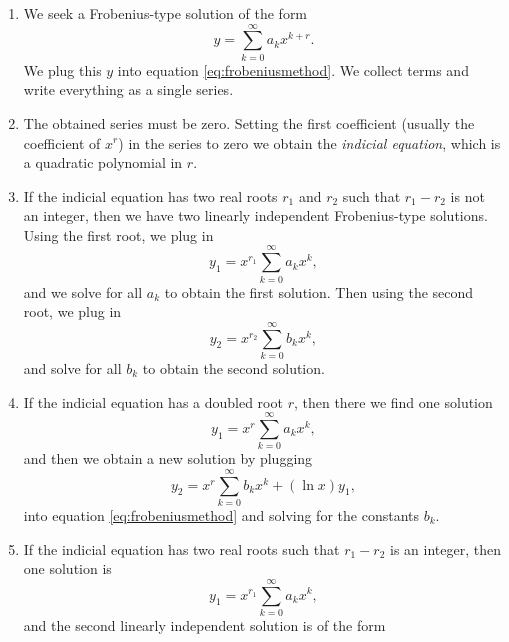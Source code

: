 \documentclass{ximera}
\begin{document}
\begin{enumerate}
    \item We seek a Frobenius-type solution of the form
        \begin{equation*}
            y = \sum_{k=0}^\infty a_k x^{k+r} .
        \end{equation*}
        We plug this $y$ into equation \eqref{eq:frobeniusmethod}.  We collect terms and write everything as a single series.
    \item The obtained series must be zero.  Setting the first coefficient (usually the coefficient of $x^r$) in the series to zero we obtain the \emph{indicial equation}, which is a quadratic polynomial in $r$.
    \item If the indicial equation has two real roots $r_1$ and $r_2$ such that $r_1 - r_2$ is not an integer, then we have two linearly independent Frobenius-type solutions.  Using the first root, we plug in
        \begin{equation*}
            y_1 = x^{r_1} \sum_{k=0}^\infty a_k x^{k} ,
        \end{equation*}
        and we solve for all $a_k$ to obtain the first solution.  Then using the second root, we plug in
        \begin{equation*}
            y_2 = x^{r_2} \sum_{k=0}^\infty b_k x^{k} ,
        \end{equation*}
        and solve for all $b_k$ to obtain the second solution.
    \item If the indicial equation has a doubled root $r$, then there we find one solution
        \begin{equation*}
            y_1 = x^{r} \sum_{k=0}^\infty a_k x^{k} ,
        \end{equation*}
        and then we obtain a new solution by plugging
        \begin{equation*}
            y_2 = x^{r} \sum_{k=0}^\infty b_k x^{k} + (\ln x) y_1 ,
        \end{equation*}
        into equation \eqref{eq:frobeniusmethod} and solving for the constants $b_k$.
    \item If the indicial equation has two real roots such that $r_1-r_2$ is an integer, then one solution is
        \begin{equation*}
            y_1 = x^{r_1} \sum_{k=0}^\infty a_k x^{k} ,
        \end{equation*}
        and the second linearly independent solution is of the form
        \begin{equation*}

\end{equation*}
\end{enumerate}
\end{document}
